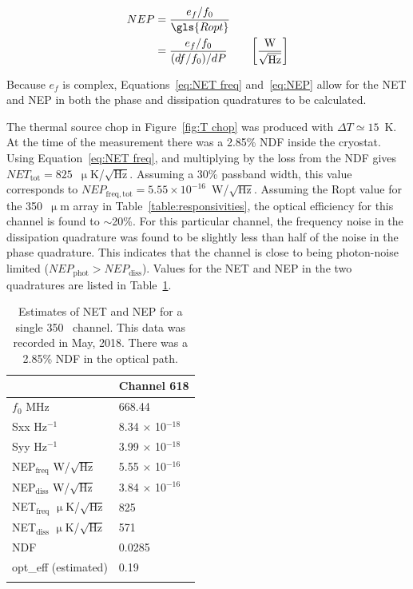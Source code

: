 \begin{equation}\label{eq:NEP}
  \begin{aligned}
  NEP &= \frac{e_{f}/f_{0}}{\gls{Ropt}} \\
      &=  \frac{e_{f}/f_{0}}{(df/f_{0})/dP} \qquad \left[ \frac{\mathrm{W}}{ \sqrt{\mathrm{Hz}} } \right]
  \end{aligned}
\end{equation}

Because $e_{f}$ is complex, Equations~\ref{eq:NET freq} and~\ref{eq:NEP} allow for the NET and NEP in both the phase and dissipation quadratures to be calculated.

The thermal source chop in Figure~\ref{fig:T chop} was produced with $\Delta T \simeq 15$~K. At the time of the measurement there was a 2.85\% NDF inside the cryostat. Using Equation~\ref{eq:NET freq}, and multiplying by the loss from the NDF gives $NET_{\mathrm{tot}} = 825$~$\upmu$K/$\sqrt{\mathrm{Hz}}$. Assuming a 30\% passband width, this value corresponds to $NEP_{\mathrm{freq,tot}} = 5.55 \times 10^{-16}$~W/$\sqrt{\mathrm{Hz}}$. Assuming the \gls{Ropt} value for the 350~$\upmu$m array in Table~\ref{table:responsivities}, the optical efficiency for this channel is found to $\sim$20\%. For this particular channel, the frequency noise in the dissipation quadrature was found to be slightly less than half of the noise in the phase quadrature. This indicates that the channel is close to being photon-noise limited ($NEP_{\mathrm{phot}} > NEP_{\mathrm{diss}}$). Values for the NET and NEP in the two quadratures are listed in Table~\ref{table:NET NEP example}.


\begin{table}[!htbp]
\centering
\caption[~Single detector NET and NEP estimated from a thermal chop.]{Estimates of NET and NEP for a single 350~ channel. This data was recorded in May, 2018. There was a 2.85\% NDF in the optical path.}
\label{table:NET NEP example}
\begin{tabular}{@{}ll@{}}
\dtoprule
 & Channel 618 \\ \midrule
$f_{0}$ MHz & 668.44 \\
\gls{Sxx} Hz$^{-1}$ & 8.34 $\times$ 10$^{-18}$ \\
\gls{Syy} Hz$^{-1}$ & 3.99 $\times$ 10$^{-18}$ \\
NEP$_{\mathrm{freq}}$ W/$\sqrt{\mathrm{Hz}}$ & 5.55 $\times$ 10$^{-16}$ \\
NEP$_{\mathrm{diss}}$ W/$\sqrt{\mathrm{Hz}}$ & 3.84 $\times$ 10$^{-16}$ \\
NET$_{\mathrm{freq}}$ $\upmu$K/$\sqrt{\mathrm{Hz}}$ & 825 \\
NET$_{\mathrm{diss}}$ $\upmu$K/$\sqrt{\mathrm{Hz}}$ & 571 \\
NDF & 0.0285 \\
\gls{opt_eff} (estimated) & 0.19 \\ \dbottomrule
\\
\end{tabular}
\end{table}

